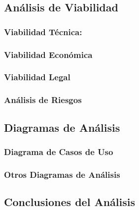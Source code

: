     \subsection{Análisis de Viabilidad}
        \subsubsection{Viabilidad Técnica:}
        \subsubsection{Viabilidad Económica}
        \subsubsection{Viabilidad Legal}
        \subsubsection{Análisis de Riesgos}

    
    \subsection{Diagramas de Análisis}

        \subsubsection{Diagrama de Casos de Uso}
        \subsubsection{Otros Diagramas de Análisis}

    \subsection{Conclusiones del Análisis}


